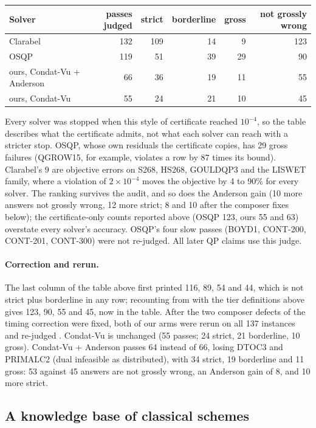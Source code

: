 \begin{center}
\small
\begin{tabular}{lrrrrr}
\toprule
Solver & passes judged & strict & borderline & gross & not grossly wrong \\
\midrule
Clarabel & 132 & 109 & 14 & 9 & 123 \\
OSQP & 119 & 51 & 39 & 29 & 90 \\
ours, Condat-Vu + Anderson & 66 & 36 & 19 & 11 & 55 \\
ours, Condat-Vu & 55 & 24 & 21 & 10 & 45 \\
\bottomrule
\end{tabular}
\end{center}

Every solver was stopped when this style of certificate reached $10^{-4}$, so
the table describes what the certificate admits, not what each solver can
reach with a stricter stop. OSQP, whose own residuals the certificate copies,
has 29 gross failures (QGROW15, for example, violates a row by 87 times its
bound). Clarabel's 9 are objective errors on S268, HS268, GOULDQP3 and the
LISWET family, where a violation of $2\times10^{-4}$ moves the objective by 4 to
90\% for every solver. The ranking survives the audit, and so does the
Anderson gain (10 more answers not grossly wrong, 12 more strict; 8 and 10
after the composer fixes below); the
certificate-only counts reported above (OSQP 123, ours 55 and 63) overstate
every solver's accuracy. OSQP's four slow passes (BOYD1, CONT-200, CONT-201,
CONT-300) were not re-judged. All later QP claims use this judge.

\paragraph{Correction and rerun.}
The last column of the table above first printed 116, 89, 54 and 44, which is
not strict plus borderline in any row; recounting from
 with the tier definitions above gives 123,
90, 55 and 45, now in the table. After the two composer defects of
the timing correction were fixed, both of our arms were rerun on all 137
instances and re-judged . Condat-Vu is unchanged (55 passes;
24 strict, 21 borderline, 10 gross). Condat-Vu + Anderson passes 64 instead of
66, losing DTOC3 and PRIMALC2 (dual infeasible as distributed), with 34 strict,
19 borderline and 11 gross: 53 against 45 answers are not grossly wrong, an
Anderson gain of 8, and 10 more strict.

\subsection{A knowledge base of classical schemes}
\label{app:log:kb}

